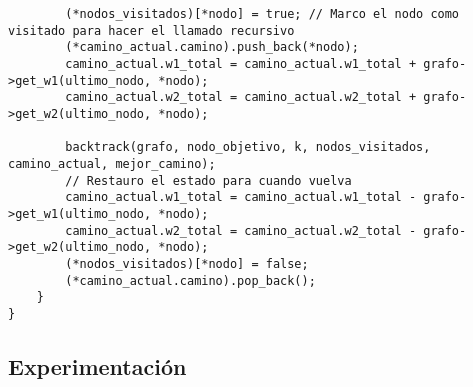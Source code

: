 \begin{lstlisting}
		(*nodos_visitados)[*nodo] = true; // Marco el nodo como visitado para hacer el llamado recursivo
		(*camino_actual.camino).push_back(*nodo);
		camino_actual.w1_total = camino_actual.w1_total + grafo->get_w1(ultimo_nodo, *nodo);
		camino_actual.w2_total = camino_actual.w2_total + grafo->get_w2(ultimo_nodo, *nodo);
		
		backtrack(grafo, nodo_objetivo, k, nodos_visitados, camino_actual, mejor_camino);
		// Restauro el estado para cuando vuelva
		camino_actual.w1_total = camino_actual.w1_total - grafo->get_w1(ultimo_nodo, *nodo);
		camino_actual.w2_total = camino_actual.w2_total - grafo->get_w2(ultimo_nodo, *nodo);
		(*nodos_visitados)[*nodo] = false;
		(*camino_actual.camino).pop_back();		
	}
}
\end{lstlisting}
\newpage

\subsection{Experimentaci\'on}

